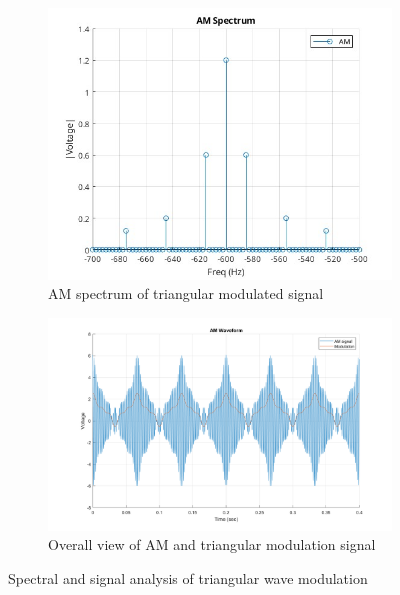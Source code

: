 \documentclass[a4paper, twocolumn]{article}
\begin{document}
        \begin{figure}[H]
            \centering
            \begin{subfigure}{0.45\textwidth}
                \centering
                \includegraphics[width=\textwidth]{Images/AM_RX_1/Triangular Wave/AM Spectrum.jpg}
                \caption{AM spectrum of triangular modulated signal}
                \label{fig:amspectrum-triangle}
            \end{subfigure}
            \hfill
            \begin{subfigure}{0.45\textwidth}
                \centering
                \includegraphics[width=\textwidth]{Images/AM_RX_1/Triangular Wave/Full AM.png}
                \caption{Overall view of AM and triangular modulation signal}
                \label{fig:fullam-triangle}
            \end{subfigure}
            \caption{Spectral and signal analysis of triangular wave modulation}
        \end{figure}
        
\end{document}
